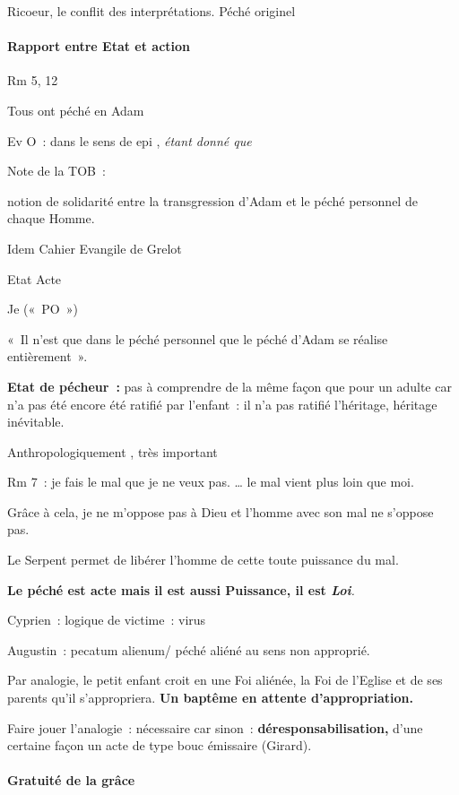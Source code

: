 Ricoeur, le conflit des interprétations. Péché originel

\hypertarget{rapport-entre-etat-et-action}{%
\paragraph{Rapport entre Etat et
action}\label{rapport-entre-etat-et-action}}

Rm 5, 12

Tous ont péché en Adam

Ev O~: dans le sens de epi , \emph{étant donné que}

Note de la TOB~:
 
  notion de solidarité entre la transgression d'Adam et le péché
  personnel de chaque Homme.
 

Idem Cahier Evangile de Grelot

 
Etat Acte
 
Je («~PO~»)

«~Il n'est que dans le péché personnel que le péché d'Adam se réalise
entièrement~».

\textbf{Etat de pécheur~:} pas à comprendre de la même façon que pour un
adulte car n'a pas été encore été ratifié par l'enfant~: il n'a pas
ratifié l'héritage, héritage inévitable.

Anthropologiquement , très important

Rm 7~: je fais le mal que je ne veux pas. \ldots{} le mal vient plus
loin que moi.

Grâce à cela, je ne m'oppose pas à Dieu et l'homme avec son mal ne
s'oppose pas.

Le Serpent permet de libérer l'homme de cette toute puissance du mal.

\textbf{Le péché est acte mais il est aussi Puissance, il est
\emph{Loi}}\emph{.}

Cyprien~: logique de victime~: virus

Augustin~: pecatum alienum/ péché aliéné au sens non approprié.

Par analogie, le petit enfant croit en une Foi aliénée, la Foi de
l'Eglise et de ses parents qu'il s'appropriera. \textbf{Un baptême en
attente d'appropriation.}

Faire jouer l'analogie~: nécessaire car sinon~:
\textbf{déresponsabilisation,} d'une certaine façon un acte de type bouc
émissaire (Girard).

\hypertarget{gratuituxe9-de-la-gruxe2ce}{%
\paragraph{Gratuité de la grâce}\label{gratuituxe9-de-la-gruxe2ce}}

